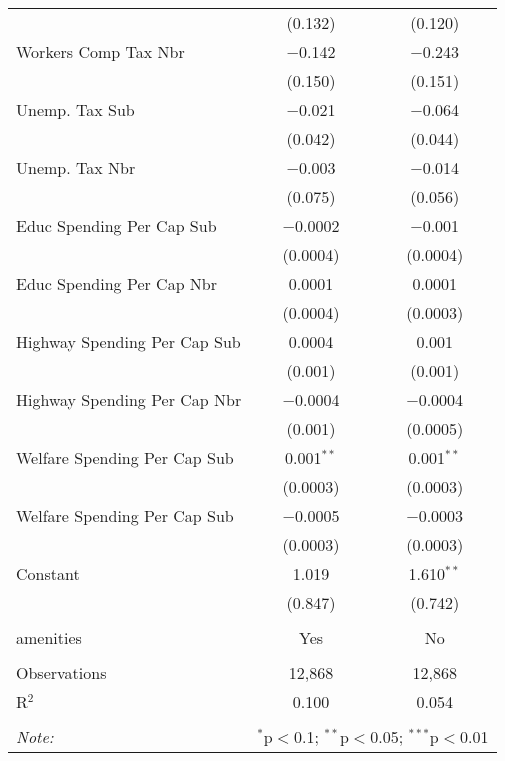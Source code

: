 \begin{table}[!htbp]
\begin{tabular}{@{\extracolsep{5pt}}lcc}
  & (0.132) & (0.120) \\ 
  Workers Comp Tax Nbr & $-$0.142 & $-$0.243 \\ 
  & (0.150) & (0.151) \\ 
  Unemp. Tax Sub & $-$0.021 & $-$0.064 \\ 
  & (0.042) & (0.044) \\ 
  Unemp. Tax Nbr & $-$0.003 & $-$0.014 \\ 
  & (0.075) & (0.056) \\ 
  Educ Spending Per Cap Sub & $-$0.0002 & $-$0.001 \\ 
  & (0.0004) & (0.0004) \\ 
  Educ Spending Per Cap Nbr & 0.0001 & 0.0001 \\ 
  & (0.0004) & (0.0003) \\ 
  Highway Spending Per Cap Sub & 0.0004 & 0.001 \\ 
  & (0.001) & (0.001) \\ 
  Highway Spending Per Cap Nbr & $-$0.0004 & $-$0.0004 \\ 
  & (0.001) & (0.0005) \\ 
  Welfare Spending Per Cap Sub & 0.001$^{**}$ & 0.001$^{**}$ \\ 
  & (0.0003) & (0.0003) \\ 
  Welfare Spending Per Cap Sub & $-$0.0005 & $-$0.0003 \\ 
  & (0.0003) & (0.0003) \\ 
  Constant & 1.019 & 1.610$^{**}$ \\ 
  & (0.847) & (0.742) \\ 
 \hline \\[-1.8ex] 
amenities & Yes & No \\ 
\hline \\[-1.8ex] 
Observations & 12,868 & 12,868 \\ 
R$^{2}$ & 0.100 & 0.054 \\ 
\hline 
\hline \\[-1.8ex] 
\textit{Note:}  & \multicolumn{2}{r}{$^{*}$p$<$0.1; $^{**}$p$<$0.05; $^{***}$p$<$0.01} \\ 
\end{tabular} 
\end{table} 
